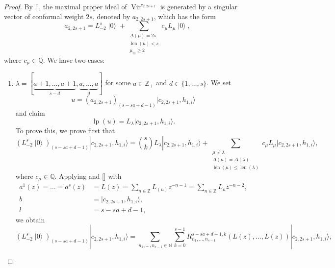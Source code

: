\documentclass[a4paper, 12pt, reqno]{amsart}
\theoremstyle{remark}
\DeclareMathOperator{\Vir}{Vir}
\DeclareMathOperator{\len}{len}
\DeclareMathOperator{\vac}{|0\rangle}
\DeclareMathOperator{\lp}{lp}
\begin{document}
\begin{proof}
  By [], the maximal proper ideal of $\Vir^{c_{2, 2s + 1}}$ is generated by a singular vector of conformal weight $2s$, denoted by $a_{2, 2s + 1}$, which has the form
  \begin{equation}
    \label{eq:8}
    a_{2, 2s + 1} = L_{-2}^s\vac + \sum_{\substack{\Delta(\mu) = 2s \\ \len(\mu) < s \\ \mu_m \ge 2}}c_{\mu}L_{\mu}\vac,
  \end{equation}
  where $c_{\mu} \in \mathbb{Q}$.
  We have two cases:
  \begin{enumerate}
  \item $\lambda = [\underbrace{a + 1, \dots, a + 1}_{s - d}, \underbrace{a, \dots, a}_d]$ for some $a \in \mathbb{Z}_+$ and $d \in \{1, \dots, s\}$.
    We set
    \begin{equation*}
      u = (a_{2, 2s + 1})_{(s - sa + d - 1)}|c_{2, 2s + 1}, h_{1, i}\rangle
    \end{equation*}
    and claim
    \begin{equation}
      \label{eq:7}
      \lp(u) = L_{\lambda}|c_{2, 2s + 1}, h_{1, i}\rangle.
    \end{equation}
    To prove this, we prove first that
    \begin{equation}
      \label{eq:6}
      (L_{-2}^s\vac)_{(s - sa + d - 1)}|c_{2, 2s + 1}, h_{1, i}\rangle = \binom{s}{k}L_{\lambda}|c_{2, 2s + 1}, h_{1, i}\rangle + \sum_{\substack{\mu \neq \lambda \\ \Delta(\mu) = \Delta(\lambda) \\ \len(\mu) \le \len(\lambda)}}c_{\mu}L_{\mu}|c_{2, 2s + 1}, h_{1, i}\rangle,
    \end{equation}
    where $c_{\mu} \in \mathbb{Q}$.
    Applying  and [] with
    \begin{align*}
      a^1(z) = \dots = a^s(z) &= L(z) = \sum_{n \in \mathbb{Z}}L_(n)z^{-n - 1} = \sum_{n \in \mathbb{Z}}L_nz^{-n - 2}, \\
      b &= |c_{2, 2s + 1}, h_{1, i}\rangle, \\
      l &= s - sa + d - 1,
    \end{align*}
    we obtain
    \begin{equation}
      \label{eq:5}
      (L_{-2}^s\vac)_{(s - sa + d - 1)}|c_{2, 2s + 1}, h_{1, i}\rangle = \sum_{n_1, \dots, n_{s - 1} \in \mathbb{N}}\sum_{k = 0}^{s - 1}R^{s - sa + d - 1, k}_{n_1, \dots, n_{s - 1}}(L(z), \dots, L(z))|c_{2, 2s + 1}, h_{1, i}\rangle,

\end{equation}
\end{enumerate}
\end{proof}
\end{document}
